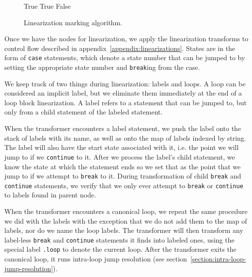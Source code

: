 \documentclass[journal,a4paper]{IEEEtran}
\begin{document}
\begin{figure}
\begin{algorithmic}
        \State {}
        \State \Return True
    \EndIf
            \State {}
        \EndIf
    \EndFor
        \State \Return True
    \Else
        \State \Return False
    \EndIf
\EndFunction\end{algorithmic}
\caption{Linearization marking algorithm.}
\label{algorithm:mark-for-linearizing}
\end{figure}

Once we have the nodes for linearization, we apply the linearization transforms to control flow
described in appendix~\ref{appendix:linearizations}. States are in the form of \texttt{case}
statements, which denote a state number that can be jumped to by setting the appropriate state
number and \texttt{break}ing from the case.

We keep track of two things during linearization: labels and loops. A loop can be considered an
implicit label, but we eliminate them immediately at the end of a loop block linearization. A label
refers to a statement that can be jumped to, but only from a child statement of the labeled
statement.

When the transformer encounters a label statement, we push the label onto the stack of labels with
its name, as well as onto the map of labels indexed by string. The label will also have the start
state associated with it, i.e. the point we will jump to if we \texttt{continue} to it. After we
process the label's child statement, we know the state at which the statement ends so we set that
as the point that we jump to if we attempt to \texttt{break} to it. During transformation of child
\texttt{break} and \texttt{continue} statements, we verify that we only ever attempt to
\texttt{break} or \texttt{continue} to labels found in parent node.

When the transformer encounters a canonical loop, we repeat the same procedure we did with the
labels with the exception that we do not add them to the map of labels, nor do we name the loop
labels. The transformer will then transform any label-less \texttt{break} and \texttt{continue}
statements it finds into labeled ones, using the special label \texttt{.loop} to denote the current
loop. After the transformer exits the canonical loop, it runs intra-loop jump resolution (see
section~\ref{section:intra-loop-jump-resolution}).
\end{document}
